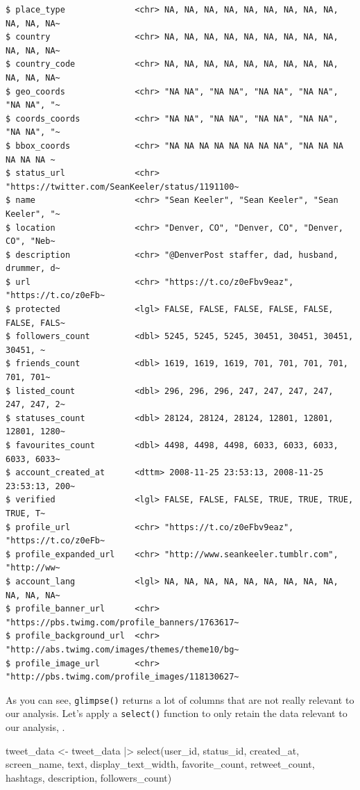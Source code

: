 \documentclass[
  letterpaper,
  DIV=11,
  numbers=noendperiod]{scrreprt}
\newenvironment{Shaded}{\begin{snugshade}}{\end{snugshade}}
\newcommand{\FunctionTok}[1]{\textcolor[rgb]{0.28,0.35,0.67}{#1}}
\newcommand{\NormalTok}[1]{\textcolor[rgb]{0.00,0.23,0.31}{#1}}
\newcommand{\OtherTok}[1]{\textcolor[rgb]{0.00,0.23,0.31}{#1}}
\newcommand{\SpecialCharTok}[1]{\textcolor[rgb]{0.37,0.37,0.37}{#1}}
\begin{document}
\begin{verbatim}
$ place_type              <chr> NA, NA, NA, NA, NA, NA, NA, NA, NA, NA, NA, NA~
$ country                 <chr> NA, NA, NA, NA, NA, NA, NA, NA, NA, NA, NA, NA~
$ country_code            <chr> NA, NA, NA, NA, NA, NA, NA, NA, NA, NA, NA, NA~
$ geo_coords              <chr> "NA NA", "NA NA", "NA NA", "NA NA", "NA NA", "~
$ coords_coords           <chr> "NA NA", "NA NA", "NA NA", "NA NA", "NA NA", "~
$ bbox_coords             <chr> "NA NA NA NA NA NA NA NA", "NA NA NA NA NA NA ~
$ status_url              <chr> "https://twitter.com/SeanKeeler/status/1191100~
$ name                    <chr> "Sean Keeler", "Sean Keeler", "Sean Keeler", "~
$ location                <chr> "Denver, CO", "Denver, CO", "Denver, CO", "Neb~
$ description             <chr> "@DenverPost staffer, dad, husband, drummer, d~
$ url                     <chr> "https://t.co/z0eFbv9eaz", "https://t.co/z0eFb~
$ protected               <lgl> FALSE, FALSE, FALSE, FALSE, FALSE, FALSE, FALS~
$ followers_count         <dbl> 5245, 5245, 5245, 30451, 30451, 30451, 30451, ~
$ friends_count           <dbl> 1619, 1619, 1619, 701, 701, 701, 701, 701, 701~
$ listed_count            <dbl> 296, 296, 296, 247, 247, 247, 247, 247, 247, 2~
$ statuses_count          <dbl> 28124, 28124, 28124, 12801, 12801, 12801, 1280~
$ favourites_count        <dbl> 4498, 4498, 4498, 6033, 6033, 6033, 6033, 6033~
$ account_created_at      <dttm> 2008-11-25 23:53:13, 2008-11-25 23:53:13, 200~
$ verified                <lgl> FALSE, FALSE, FALSE, TRUE, TRUE, TRUE, TRUE, T~
$ profile_url             <chr> "https://t.co/z0eFbv9eaz", "https://t.co/z0eFb~
$ profile_expanded_url    <chr> "http://www.seankeeler.tumblr.com", "http://ww~
$ account_lang            <lgl> NA, NA, NA, NA, NA, NA, NA, NA, NA, NA, NA, NA~
$ profile_banner_url      <chr> "https://pbs.twimg.com/profile_banners/1763617~
$ profile_background_url  <chr> "http://abs.twimg.com/images/themes/theme10/bg~
$ profile_image_url       <chr> "http://pbs.twimg.com/profile_images/118130627~
\end{verbatim}

As you can see, \texttt{glimpse()} returns a lot of columns that are not
really relevant to our analysis. Let's apply a \texttt{select()}
function to only retain the data relevant to our analysis, .

\begin{Shaded}
\begin{Highlighting}[]
\NormalTok{tweet\_data }\OtherTok{\textless{}{-}}\NormalTok{ tweet\_data }\SpecialCharTok{|\textgreater{}} 
  \FunctionTok{select}\NormalTok{(user\_id, status\_id, created\_at, screen\_name, text, display\_text\_width,}
\NormalTok{         favorite\_count, retweet\_count, hashtags, description, followers\_count)}
\end{Highlighting}
\end{Shaded}
\end{document}

